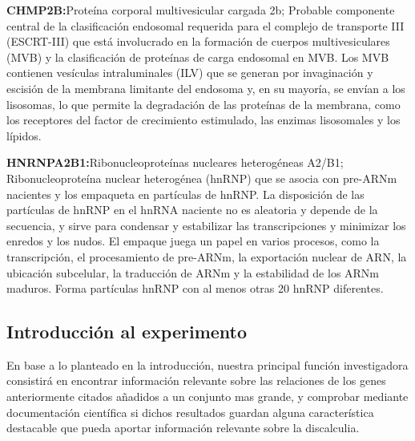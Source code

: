 \hfill

\textbf{CHMP2B\cite{CHMP2B}:}Proteína corporal multivesicular cargada 2b; Probable componente central de la clasificación endosomal requerida para el complejo de transporte III (ESCRT-III) que está involucrado en la formación de cuerpos multivesiculares (MVB) y la clasificación de proteínas de carga endosomal en MVB. Los MVB contienen vesículas intraluminales (ILV) que se generan por invaginación y escisión de la membrana limitante del endosoma y, en su mayoría, se envían a los lisosomas, lo que permite la degradación de las proteínas de la membrana, como los receptores del factor de crecimiento estimulado, las enzimas lisosomales y los lípidos.

\hfill

\textbf{HNRNPA2B1\cite{HNRNPA2B1}:}Ribonucleoproteínas nucleares heterogéneas A2/B1; Ribonucleoproteína nuclear heterogénea (hnRNP) que se asocia con pre-ARNm nacientes y los empaqueta en partículas de hnRNP. La disposición de las partículas de hnRNP en el hnRNA naciente no es aleatoria y depende de la secuencia, y sirve para condensar y estabilizar las transcripciones y minimizar los enredos y los nudos. El empaque juega un papel en varios procesos, como la transcripción, el procesamiento de pre-ARNm, la exportación nuclear de ARN, la ubicación subcelular, la traducción de ARNm y la estabilidad de los ARNm maduros. Forma partículas hnRNP con al menos otras 20 hnRNP diferentes.


\subsection{Introducción al experimento}

\hfill

En base a lo planteado en la introducción, nuestra principal función investigadora consistirá en encontrar información relevante sobre las relaciones de los genes anteriormente citados añadidos a un conjunto mas grande, y comprobar mediante documentación científica si dichos resultados guardan alguna característica destacable que pueda aportar información relevante sobre la discalculia.

\newpage